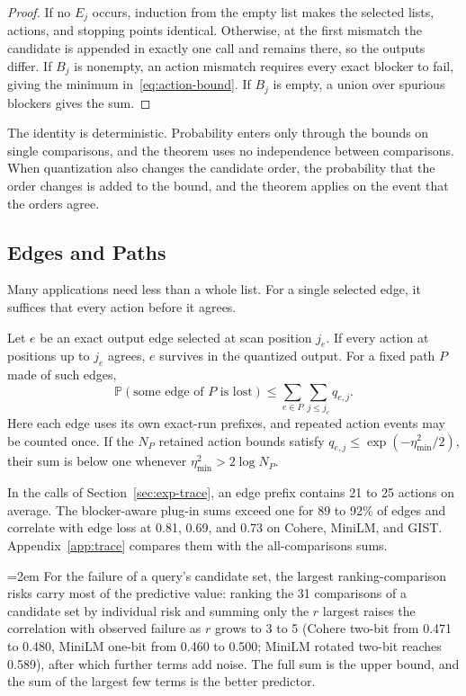 \documentclass[twoside,11pt]{article}
\newcommand{\Pp}{\mathbb{P}}
\begin{document}
\begin{proof}
If no $E_j$ occurs, induction from the empty list makes the selected lists, actions, and stopping points identical. Otherwise, at the first mismatch the candidate is appended in exactly one call and remains there, so the outputs differ. If $B_j$ is nonempty, an action mismatch requires every exact blocker to fail, giving the minimum in~\eqref{eq:action-bound}. If $B_j$ is empty, a union over spurious blockers gives the sum.
\end{proof}

The identity is deterministic. Probability enters only through the bounds on single comparisons, and the theorem uses no independence between comparisons. When quantization also changes the candidate order, the probability that the order changes is added to the bound, and the theorem applies on the event that the orders agree.

\subsection{Edges and Paths}
\label{sec:edges}

Many applications need less than a whole list. For a single selected edge, it suffices that every action before it agrees.

\begin{corollary}
\label{cor:path}
Let $e$ be an exact output edge selected at scan position $j_e$. If every action at positions up to $j_e$ agrees, $e$ survives in the quantized output. For a fixed path $P$ made of such edges,
\begin{equation}
\Pp(\text{some edge of }P\text{ is lost})\le\sum_{e\in P}\sum_{j\le j_e}q_{e,j}.
\end{equation}
Here each edge uses its own exact-run prefixes, and repeated action events may be counted once. If the $N_P$ retained action bounds satisfy $q_{e,j}\le\exp(-\eta_{\min}^2/2)$, their sum is below one whenever $\eta_{\min}^2>2\log N_P$.
\end{corollary}

In the calls of Section~\ref{sec:exp-trace}, an edge prefix contains 21 to 25 actions on average. The blocker-aware plug-in sums exceed one for 89 to 92\% of edges and correlate with edge loss at 0.81, 0.69, and 0.73 on Cohere, MiniLM, and GIST. Appendix~\ref{app:trace} compares them with the all-comparisons sums.

\begin{remark}
\label{rem:topr}
\begingroup\emergencystretch=2em
For the failure of a query's candidate set, the largest ranking-comparison risks carry most of the predictive value: ranking the 31 comparisons of a candidate set by individual risk and summing only the $r$ largest raises the correlation with observed failure as $r$ grows to 3 to 5 (Cohere two-bit from 0.471 to 0.480, MiniLM one-bit from 0.460 to 0.500; MiniLM rotated two-bit reaches 0.589), after which further terms add noise. The full sum is the upper bound, and the sum of the largest few terms is the better predictor.
\par\endgroup
\end{remark}
\end{document}
